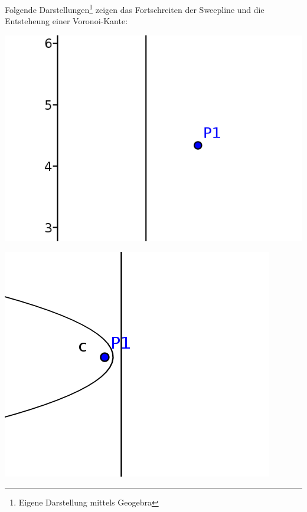 \newpage{}

Folgende Darstellungen\footnote{Eigene Darstellung mittels Geogebra} zeigen das Fortschreiten der Sweepline und die Entsteheung einer Voronoi-Kante:

\begin{minipage}[t]{0.5\textwidth}
    \includegraphics[width=\textwidth]{images/sweep_line_01.png}
\label{fig:delaunayExample01Orig}
\end{minipage}
\begin{minipage}[t]{0.5\textwidth}
    \includegraphics[width=\textwidth]{images/sweep_line_02.png}
\label{fig:delaunayExample01500}
\end{minipage}

